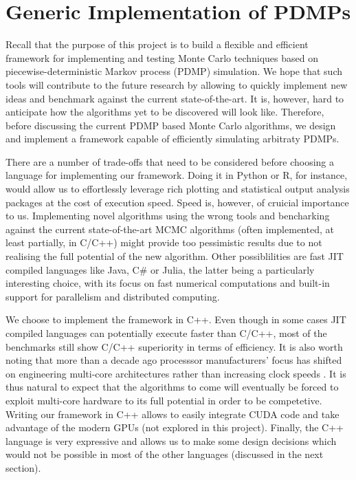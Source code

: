 \documentclass[report.tex]{subfiles}
\begin{document}
\chapter{Generic Implementation of PDMPs}
\label{pdmps-implementation}

Recall that the purpose of this project is to build a flexible and efficient
framework for implementing and testing Monte Carlo techniques based on
piecewise-deterministic Markov process (PDMP) simulation.
We hope that such tools will contribute to the future research by allowing to
quickly implement new ideas and benchmark against the current state-of-the-art.
It is, however, hard to anticipate how the algorithms yet to be discovered
will look like.
Therefore, before discussing the current PDMP based Monte Carlo algorithms,
we design and implement a framework capable of efficiently simulating
arbitraty PDMPs.

There are a number of trade-offs that need to be considered before choosing a language
for implementing our framework.
Doing it in Python or R, for instance, would allow us to effortlessly leverage rich plotting
and statistical output analysis packages at the cost of execution speed.
Speed is, however, of cruicial importance to us.
Implementing novel algorithms using the wrong tools and bencharking against
the current state-of-the-art MCMC algorithms (often implemented, at least partially,
in C/C++) might provide too pessimistic results due to not realising the full potential
of the new algorithm.
Other possiblilities are fast JIT compiled languages like Java, C\# or Julia,
the latter being a particularly interesting choice, with its focus on fast numerical
computations and built-in support for parallelism and distributed computing.

We choose to implement the framework in C++.
Even though in some cases JIT compiled languages can potentially execute faster than
C/C++, most of the benchmarks still show C/C++ superiority in terms of efficiency.
It is also worth noting that more than a decade ago processsor manufacturers’ focus has shifted on
engineering multi-core architectures rather than increasing clock speeds \citet{sutter2005free}.
It is thus natural to expect that the algorithms to come will eventually be
forced to exploit multi-core hardware to its full potential in order to be competetive.
Writing our framework in C++ allows to easily integrate CUDA code and take advantage
of the modern GPUs (not explored in this project).
Finally, the C++ language is very expressive and allows us to make some design decisions
which would not be possible in most of the other languages (discussed in the next section).
\end{document}
